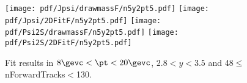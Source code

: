 \begin{figure}[H]
\begin{center}
\texttt{[image: pdf/Jpsi/drawmassF/n5y2pt5.pdf]}
\texttt{[image: pdf/Jpsi/2DFitF/n5y2pt5.pdf]}
\vspace*{-0.5cm}
\texttt{[image: pdf/Psi2S/drawmassF/n5y2pt5.pdf]}
\texttt{[image: pdf/Psi2S/2DFitF/n5y2pt5.pdf]}
\vspace*{-0.5cm}
\end{center}
\caption{Fit results in $8\gevc<\pt<20\gevc$, $2.8<y<3.5$ and 48$\leq$nForwardTracks$<$130.}
\label{Fitn5y2pt5}
\end{figure}
